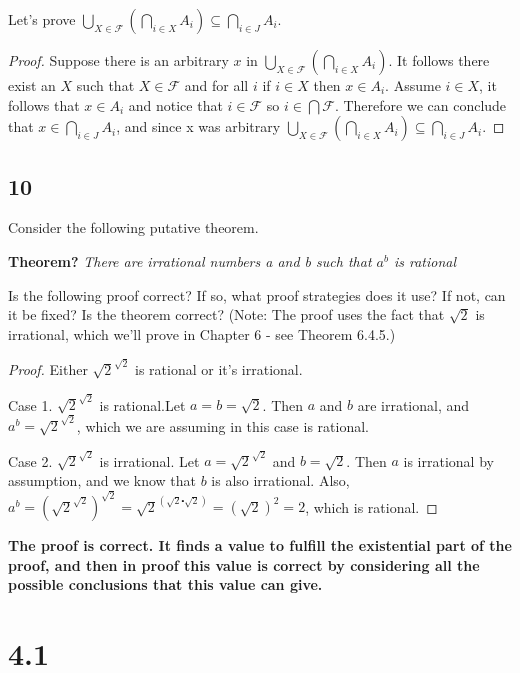 \documentclass{article}
\begin{document}
Let's prove $\bigcup_{X \in \mathcal{F}}(\bigcap_{i\in X}A_i) \subseteq \bigcap_{i \in J}A_i$.

\begin{proof}
Suppose there is an arbitrary $x$ in $\bigcup_{X \in \mathcal{F}}(\bigcap_{i\in X}A_i)$. It follows there exist an $X$ such that $X \in \mathcal{F}$ and for all $i$ if $i \in X$ then $x \in A_i$. Assume $i \in X$, it follows that $x \in A_i$ and notice that $i \in \mathcal{F}$ so $i \in \bigcap \mathcal{F}$. Therefore we can conclude that $x \in \bigcap_{i \in J}A_i$, and since x was arbitrary $\bigcup_{X \in \mathcal{F}}(\bigcap_{i\in X}A_i) \subseteq \bigcap_{i \in J}A_i$.
\end{proof}
\subsection{10}
Consider the following putative theorem.

\textbf{Theorem?} \textit{There are irrational numbers a and b such that $a^b$ is rational}

Is the following proof correct? If so, what proof strategies does it use? If not, can it be fixed? Is the theorem correct? (Note: The proof uses the fact that $\sqrt{2}$ is irrational, which we'll prove in Chapter 6 - see Theorem 6.4.5.)

\begin{proof}
Either $\sqrt{2}^{\sqrt{2}}$ is rational or it's irrational. 

Case 1. $\sqrt{2}^{\sqrt{2}}$ is rational.Let $a=b=\sqrt{2}$. Then $a$ and $b$ are irrational, and $a^b=\sqrt{2}^{\sqrt{2}}$, which we are assuming in this case is rational.

Case 2. $\sqrt{2}^{\sqrt{2}}$ is irrational. Let $a = \sqrt{2}^{\sqrt{2}}$ and $b = \sqrt{2}$. Then $a$ is irrational by assumption, and we know that $b$ is also irrational. Also, $a^b=(\sqrt{2}^{\sqrt{2}})^{\sqrt{2}}=\sqrt{2}^{(\sqrt{2}\centerdot\sqrt{2})}=(\sqrt{2})^{2}=2$, which is rational.
\end{proof}

\textbf{The proof is correct. It finds a value to fulfill the existential part of the proof, and then in proof this value is correct by considering all the possible conclusions that this value can give.}

\section{4.1}
\end{document}
